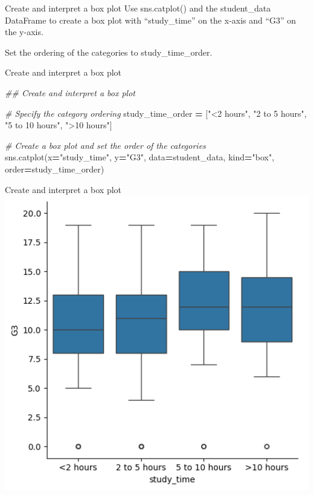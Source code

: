 \documentclass[
  ignorenonframetext,
]{beamer}
\newenvironment{Shaded}{\begin{snugshade}}{\end{snugshade}}
\newcommand{\CommentTok}[1]{\textcolor[rgb]{0.56,0.35,0.01}{\textit{#1}}}
\newcommand{\NormalTok}[1]{#1}
\newcommand{\OperatorTok}[1]{\textcolor[rgb]{0.81,0.36,0.00}{\textbf{#1}}}
\newcommand{\StringTok}[1]{\textcolor[rgb]{0.31,0.60,0.02}{#1}}
\begin{document}
\begin{frame}{Create and interpret a box plot}
\label{create-and-interpret-a-box-plot-2}
Use sns.catplot() and the student\_data DataFrame to create a box plot
with ``study\_time'' on the x-axis and ``G3'' on the y-axis.

Set the ordering of the categories to study\_time\_order.
\end{frame}

\begin{frame}[fragile]{Create and interpret a box plot}
\label{create-and-interpret-a-box-plot-3}

\begin{Shaded}
\begin{Highlighting}[]
\CommentTok{\#\# Create and interpret a box plot}

\CommentTok{\# Specify the category ordering}
\NormalTok{study\_time\_order }\OperatorTok{=}\NormalTok{ [}\StringTok{"\textless{}2 hours"}\NormalTok{, }\StringTok{"2 to 5 hours"}\NormalTok{, }
                    \StringTok{"5 to 10 hours"}\NormalTok{, }\StringTok{"\textgreater{}10 hours"}\NormalTok{]}

\CommentTok{\# Create a box plot and set the order of the categories}
\NormalTok{sns.catplot(x}\OperatorTok{=}\StringTok{"study\_time"}\NormalTok{, y}\OperatorTok{=}\StringTok{"G3"}\NormalTok{,}
\NormalTok{            data}\OperatorTok{=}\NormalTok{student\_data,}
\NormalTok{            kind}\OperatorTok{=}\StringTok{"box"}\NormalTok{,}
\NormalTok{            order}\OperatorTok{=}\NormalTok{study\_time\_order)}
\end{Highlighting}
\end{Shaded}
\end{frame}

\begin{frame}{Create and interpret a box plot}
\label{create-and-interpret-a-box-plot-4}
\includegraphics{../images/im285.png}
\end{frame}
\end{document}
